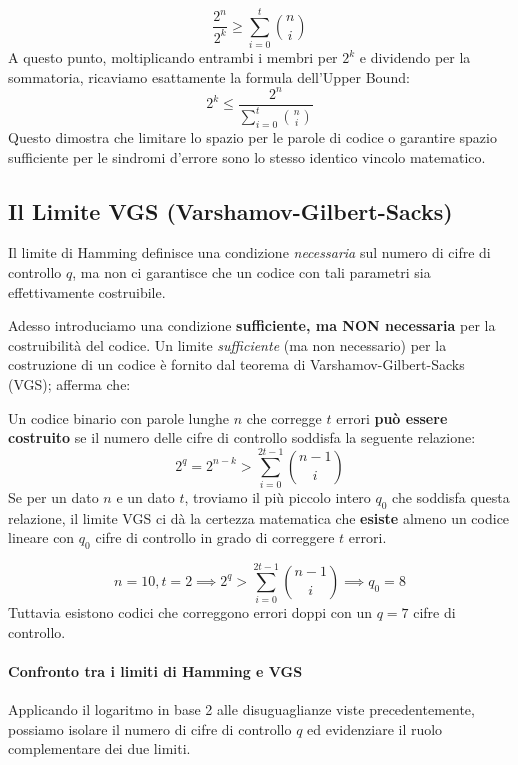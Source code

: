 \[ \frac{2^n}{2^k} \geq \sum_{i=0}^t\binom{n}{i} \]
A questo punto, moltiplicando entrambi i membri per $2^k$ e dividendo per la sommatoria, ricaviamo esattamente la formula dell'Upper Bound:
\[ 2^k \leq \frac{2^n}{\sum_{i=0}^t\binom{n}{i}} \]
Questo dimostra che limitare lo spazio per le parole di codice o garantire spazio sufficiente per le sindromi d'errore sono lo stesso identico vincolo matematico.


\subsection{Il Limite VGS (Varshamov-Gilbert-Sacks)} %
Il limite di Hamming definisce una condizione \textit{necessaria} sul numero di cifre di controllo $q$, ma non ci garantisce che un codice con tali parametri sia effettivamente costruibile. 

Adesso introduciamo una condizione \textbf{sufficiente, ma NON necessaria} per la costruibilità del codice.
Un limite \textit{sufficiente} (ma non necessario) per la costruzione di un codice è fornito dal teorema di Varshamov-Gilbert-Sacks (VGS); afferma che:

Un codice binario con parole lunghe $n$ che corregge $t$ errori \textbf{può essere costruito} se il numero delle cifre di controllo soddisfa la seguente relazione:
\[2^q=2^{n-k} > \sum_{i=0}^{2t-1}\binom{n-1}{i}\]
Se per un dato $n$ e un dato $t$, troviamo il più piccolo intero $q_0$ che soddisfa questa relazione, il limite VGS ci dà la certezza matematica che \textbf{esiste} almeno un codice lineare con $q_0$ cifre di controllo in grado di correggere $t$ errori. 

\begin{esempio}{}
    \[n=10,t=2 \implies 2^q > \sum_{i=0}^{2t-1}\binom{n-1}{i} \implies q_0=8\]
    Tuttavia esistono codici che correggono errori doppi con un $q=7$ cifre di controllo.
\end{esempio}

\paragraph{Confronto tra i limiti di Hamming e VGS} %

Applicando il logaritmo in base 2 alle disuguaglianze viste precedentemente, possiamo isolare il numero di cifre di controllo $q$ ed evidenziare il ruolo complementare dei due limiti.

